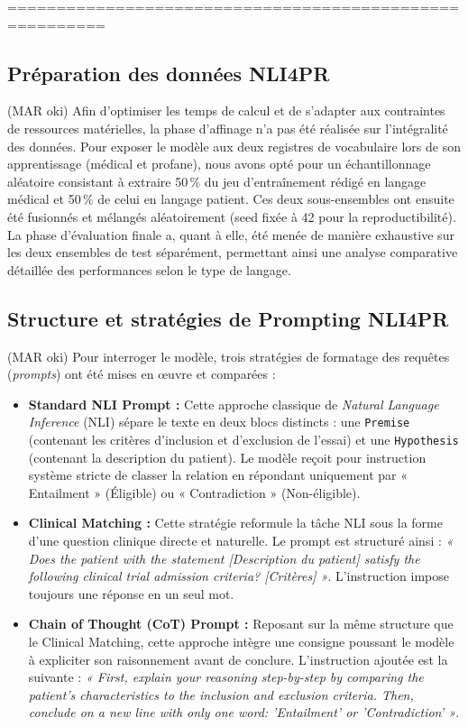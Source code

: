 ========================================================

\subsection{Préparation des données NLI4PR} (MAR oki) 
Afin d'optimiser les temps de calcul et de s'adapter aux contraintes de ressources matérielles, la phase d'affinage n'a pas été réalisée sur l'intégralité des données. Pour exposer le modèle aux deux registres de vocabulaire lors de son apprentissage (médical et profane), nous avons opté pour un échantillonnage aléatoire consistant à extraire 50\,\% du jeu d'entraînement rédigé en langage médical et 50\,\% de celui en langage patient. Ces deux sous-ensembles ont ensuite été fusionnés et mélangés aléatoirement (seed fixée à 42 pour la reproductibilité). La phase d'évaluation finale a, quant à elle, été menée de manière exhaustive sur les deux ensembles de test séparément, permettant ainsi une analyse comparative détaillée des performances selon le type de langage.

\subsection{Structure et stratégies de Prompting NLI4PR} (MAR oki)
Pour interroger le modèle, trois stratégies de formatage des requêtes (\textit{prompts}) ont été mises en œuvre et comparées :
\begin{itemize}
    \item \textbf{Standard NLI Prompt :} Cette approche classique de \textit{Natural Language Inference} (NLI) sépare le texte en deux blocs distincts : une \texttt{Premise} (contenant les critères d'inclusion et d'exclusion de l'essai) et une \texttt{Hypothesis} (contenant la description du patient). Le modèle reçoit pour instruction système stricte de classer la relation en répondant uniquement par « Entailment » (Éligible) ou « Contradiction » (Non-éligible).
    \item \textbf{Clinical Matching :} Cette stratégie reformule la tâche NLI sous la forme d'une question clinique directe et naturelle. Le prompt est structuré ainsi : \textit{« Does the patient with the statement [Description du patient] satisfy the following clinical trial admission criteria? [Critères] »}. L'instruction impose toujours une réponse en un seul mot.
    \item \textbf{Chain of Thought (CoT) Prompt :} Reposant sur la même structure que le Clinical Matching, cette approche intègre une consigne poussant le modèle à expliciter son raisonnement avant de conclure. L'instruction ajoutée est la suivante : \textit{« First, explain your reasoning step-by-step by comparing the patient's characteristics to the inclusion and exclusion criteria. Then, conclude on a new line with only one word: 'Entailment' or 'Contradiction' »}.
\end{itemize}

